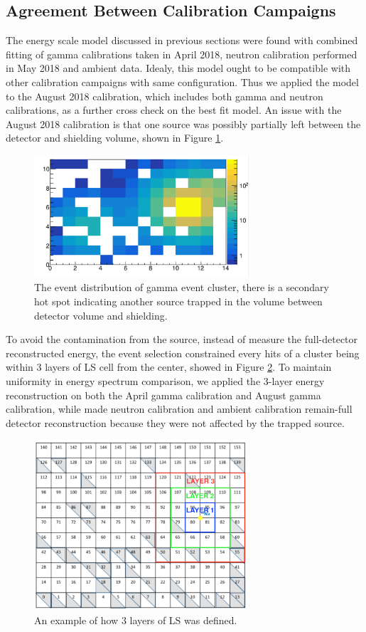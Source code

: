 \subsection{Agreement Between Calibration Campaigns}
The energy scale model discussed in previous sections were found with combined fitting of gamma calibrations taken in April 2018, neutron calibration performed in May 2018 and ambient data. 
Idealy, this model ought to be compatible with other calibration campaigns with same configuration. 
Thus we applied the model to the August 2018 calibration, which includes both gamma and neutron calibrations, as a further cross check on the best fit model.
An issue with the August 2018 calibration is that one source was possibly partially left between the detector and shielding volume, shown in Figure \ref{fig:left}.

\begin{figure}[h!]
\centering
\includegraphics[width=80mm]{figures/secondhotspot.png}
\caption{The event distribution of gamma event cluster, there is a secondary hot spot indicating another source trapped in the volume between detector volume and shielding.}
\label{fig:left}
\end{figure}

To avoid the contamination from the source, instead of measure the full-detector reconstructed energy, the event selection constrained every hits of a cluster being within 3 layers of LS cell from the center, showed in Figure \ref{fig:ring}.
To maintain uniformity in energy spectrum comparison, we applied the 3-layer energy reconstruction on both the April gamma calibration and August gamma calibration, while made neutron calibration and ambient calibration remain-full detector reconstruction because they were not affected by the trapped source.

\begin{figure}[h!]
\centering
\includegraphics[width=80mm]{figures/Ring.png}
\caption{An example of how 3 layers of LS was defined.}
\label{fig:ring}
\end{figure}

